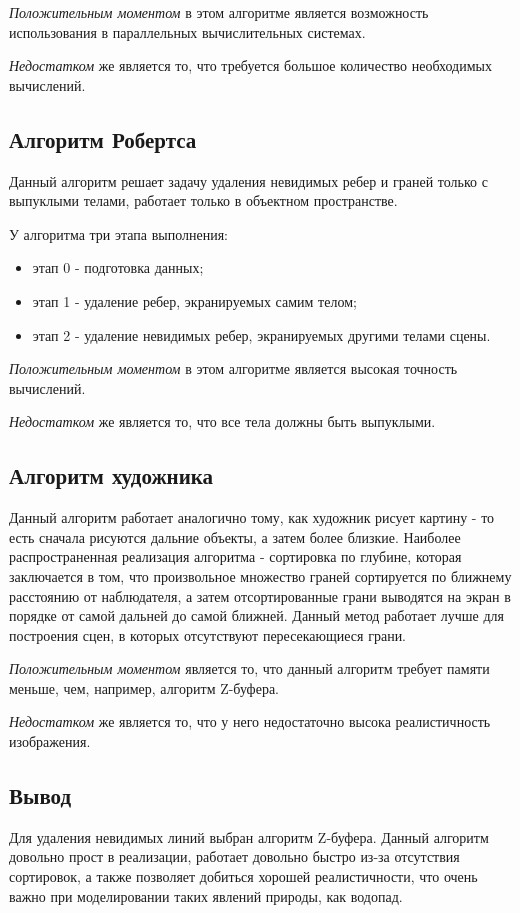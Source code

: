 \textit{Положительным моментом} в этом алгоритме является возможность использования в параллельных вычислительных системах.

\textit{Недостатком} же является то, что требуется большое количество необходимых вычислений.


\subsection{Алгоритм Робертса}
Данный алгоритм решает задачу удаления невидимых ребер и граней только с выпуклыми телами, работает только в объектном пространстве.

У алгоритма три этапа выполнения:

\begin{itemize} 
    \item этап 0 - подготовка данных; 
    \item этап 1 - удаление ребер, экранируемых самим телом; 
    \item этап 2 - удаление невидимых ребер, экранируемых другими телами сцены.
\end{itemize}  

\textit{Положительным моментом} в этом алгоритме является высокая точность вычислений. 

\textit{Недостатком} же является то, что все тела должны быть выпуклыми.

\subsection{Алгоритм художника}
Данный алгоритм работает аналогично тому, как художник рисует картину - то есть сначала рисуются дальние объекты, а затем более близкие. Наиболее распространенная реализация алгоритма - сортировка по глубине, которая заключается в том, что произвольное множество граней сортируется по ближнему расстоянию от наблюдателя, а затем отсортированные грани выводятся на экран в порядке от самой дальней до самой ближней. Данный метод работает лучше для построения сцен, в которых отсутствуют пересекающиеся грани. 

\textit{Положительным моментом} является то, что данный алгоритм требует памяти меньше, чем, например, алгоритм Z-буфера.

\textit{Недостатком} же является то, что у него недостаточно высока реалистичность изображения.

\subsection*{Вывод}
Для удаления невидимых линий выбран алгоритм Z-буфера. Данный алгоритм довольно прост в реализации, работает довольно быстро из-за отсутствия сортировок, а также позволяет добиться хорошей реалистичности, что очень важно при моделировании таких  явлений природы, как водопад.

